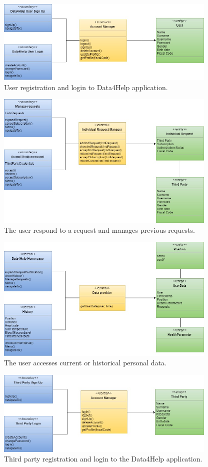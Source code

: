 \begin{figure}[ht]
    \centering
    \includegraphics[width=300pt]{images/BCE/BCE_Diagrams1.jpg}
    \caption{User registration and login to Data4Help application.}
    \label{BCE1}
\end{figure}
\begin{figure}[ht]
    \centering
    \includegraphics[width=300pt]{images/BCE/BCE_Diagrams2.jpg}
    \caption{The user respond to a request and manages previous requests.}
    \label{BCE2}
\end{figure}
\begin{figure}[ht]
    \centering
    \includegraphics[width=300pt]{images/BCE/BCE_Diagrams3.jpg}
    \caption{The user accesses current or historical personal data.}
    \label{BCE3}
\end{figure}
\begin{figure}[ht]
    \centering
    \includegraphics[width=300pt]{images/BCE/BCE_Diagrams4.jpg}
    \caption{Third party registration and login to the Data4Help application.}
    \label{BCE4}
\end{figure}
